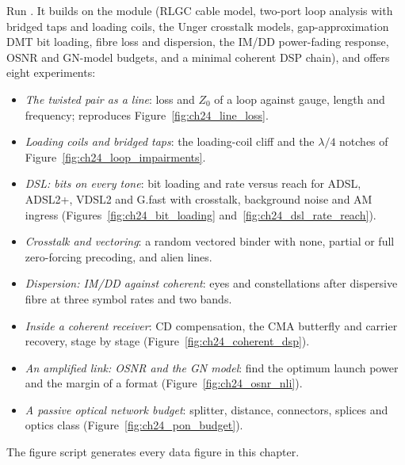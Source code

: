\begin{labbox}
Run . It builds on the module
 (RLGC cable model, two-port loop analysis with bridged taps and loading coils, the
Unger crosstalk models, gap-approximation DMT bit loading, fibre loss and dispersion, the IM/DD power-fading
response, OSNR and GN-model budgets, and a minimal coherent DSP chain), and offers eight experiments:
\begin{itemize}
\item \emph{The twisted pair as a line}: loss and $Z_0$ of a loop against gauge, length and frequency;
reproduces Figure~\ref{fig:ch24_line_loss}.
\item \emph{Loading coils and bridged taps}: the loading-coil cliff and the $\lambda/4$ notches of
Figure~\ref{fig:ch24_loop_impairments}.
\item \emph{DSL: bits on every tone}: bit loading and rate versus reach for ADSL, ADSL2+, VDSL2 and G.fast
with crosstalk, background noise and AM ingress (Figures~\ref{fig:ch24_bit_loading}
and~\ref{fig:ch24_dsl_rate_reach}).
\item \emph{Crosstalk and vectoring}: a random vectored binder with none, partial or full zero-forcing
precoding, and alien lines.
\item \emph{Dispersion: IM/DD against coherent}: eyes and constellations after dispersive fibre at three
symbol rates and two bands.
\item \emph{Inside a coherent receiver}: CD compensation, the CMA butterfly and carrier recovery, stage by
stage (Figure~\ref{fig:ch24_coherent_dsp}).
\item \emph{An amplified link: OSNR and the GN model}: find the optimum launch power and the margin of a
format (Figure~\ref{fig:ch24_osnr_nli}).
\item \emph{A passive optical network budget}: splitter, distance, connectors, splices and optics class
(Figure~\ref{fig:ch24_pon_budget}).
\end{itemize}
The figure script  generates every data figure in this chapter.
\end{labbox}

